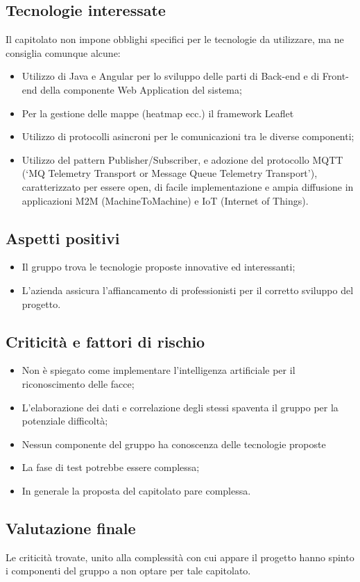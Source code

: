 \subsection{Tecnologie interessate}
Il capitolato non impone obblighi specifici per le tecnologie da utilizzare, ma ne consiglia comunque alcune:
\begin{itemize}
\item Utilizzo di Java e Angular per lo sviluppo delle parti di Back-end e di Front-end della componente Web
Application del sistema;
\item Per la gestione delle mappe (heatmap ecc.) il framework Leaflet
\item Utilizzo di protocolli asincroni per le comunicazioni tra le diverse componenti;
\item Utilizzo del pattern Publisher/Subscriber, e adozione del protocollo MQTT (‘MQ Telemetry Transport
or Message Queue Telemetry Transport’), caratterizzato per essere open, di facile implementazione
e ampia diffusione in applicazioni M2M (MachineToMachine) e IoT (Internet of Things).
\end{itemize}

\subsection{Aspetti positivi}
\begin{itemize}
\item Il gruppo trova le tecnologie proposte innovative ed interessanti;
\item L'azienda assicura l'affiancamento di professionisti per il corretto sviluppo del progetto.
\end{itemize}

\subsection{Criticità e fattori di rischio}
\begin{itemize}
\item Non è spiegato come implementare l'intelligenza artificiale per il riconoscimento delle facce;
\item L'elaborazione dei dati e correlazione degli stessi spaventa il gruppo per la potenziale difficoltà;
\item Nessun componente del gruppo ha conoscenza delle tecnologie proposte
\item La fase di test potrebbe essere complessa;
\item In generale la proposta del capitolato pare complessa.
\end{itemize}

\subsection{Valutazione finale}
Le criticità trovate, unito alla complessità con cui appare il progetto hanno spinto i componenti del gruppo a non optare per tale capitolato.
